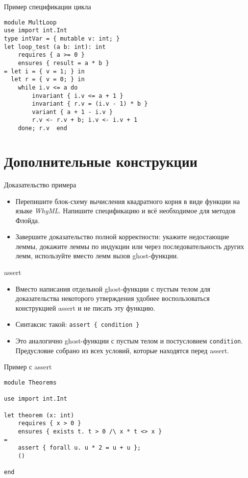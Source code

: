 \documentclass[hyperref={unicode=true}]{beamer}
\begin{document}
    \begin{frame}[fragile]{Пример спецификации цикла}
    \begin{lstlisting}
module MultLoop
use import int.Int
type intVar = { mutable v: int; }
let loop_test (a b: int): int
    requires { a >= 0 }
    ensures { result = a * b }
= let i = { v = 1; } in
  let r = { v = 0; } in
    while i.v <= a do
        invariant { i.v <= a + 1 }
        invariant { r.v = (i.v - 1) * b }
        variant { a + 1 - i.v }
        r.v <- r.v + b; i.v <- i.v + 1
    done; r.v  end
    \end{lstlisting}
    \end{frame}

    \section{Дополнительные конструкции}

    \begin{frame}{Доказательство примера}
    \begin{itemize}
    \item
    Перепишите блок-схему вычисления квадратного корня в виде функции
    на языке \textsl{WhyML}. Напишите спецификацию и всё необходимое
    для методов Флойда.
    \item
    Завершите доказательство полной корректности: укажите недостающие
    леммы, докажите леммы по индукции или через последовательность
    других лемм, используйте вместо лемм вызов ghost-функции.
    \end{itemize}
    \end{frame}

    \begin{frame}{assert}
    \begin{itemize}
    \item
    Вместо написания отдельной ghost-функции с пустым телом для
    доказательства некоторого утверждения удобнее воспользоваться
    конструкцией assert и не писать эту функцию.
    \item
    Синтаксис такой: \texttt{assert \{ condition \}}
    \item
    Это аналогично ghost-функции с пустым телом и постусловием
    \texttt{condition}. Предусловие собрано из всех условий, которые
    находятся перед assert.
    \end{itemize}
    \end{frame}

    \begin{frame}[fragile]{Пример с assert}
    \begin{lstlisting}
module Theorems

use import int.Int

let theorem (x: int)
    requires { x > 0 }
    ensures { exists t. t > 0 /\ x * t <> x }
=
    assert { forall u. u * 2 = u + u };
    ()

end
    \end{lstlisting}
    \end{frame}
\end{document}
